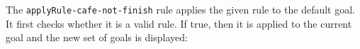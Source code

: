 
{\codesize
\begin{comment}
  crl [showUnprovedGoals-cafe] :
      < O : X@Database | db : DB, input : ('show`unproved`goals`..@Command@),
                         output : nil, pTree : P, currentGoal : GID, showMod : B,
                         language : cafeobj, originalCafeModule : T,
       Atts >
   => < O : X@Database | db : DB, input : nilTermList,
                         output : if PS =/= empty
                                  then (prettyPrintProofTreeAuxCafe(PS, DB, B, T)
                                        '\n '\g 'INFO: '\o (qid(string(num(PS), 10))
                                        'goal '`( 's '`) ' 'unproved! '\n '\g 'INFO:
                                        '\o 'Next 'goal 'to 'be 'proved 'is '\r
                                        getDefaultGoalIndex(PS) '\o))
                                  else ('\r 'WARNING: 'no 'goals!)
                                  fi, pTree : P, currentGoal : getDefaultGoalIndex(PS),
                         showMod : B, language : cafeobj, originalCafeModule : T, Atts >
   if PS := unprovedGoals(P) .
\end{comment}
}

The \texttt{applyRule-cafe-not-finish} rule applies the given rule to the default goal.
It first checks whether it is a valid rule. If true, then it is applied to the current
goal and the new set of goals is displayed:


